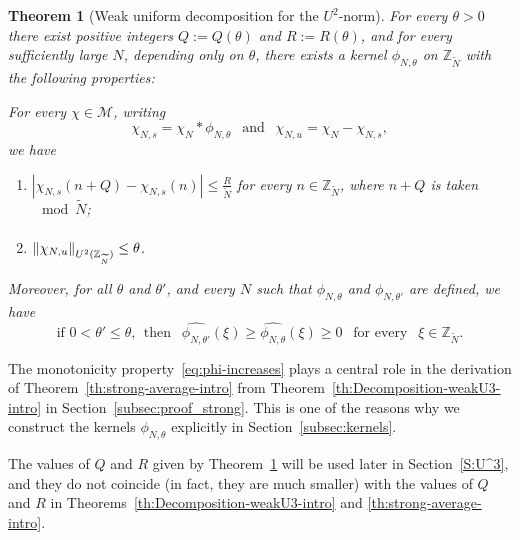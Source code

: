 \documentclass[11pt]{amsart}
\newtheorem{theorem}[lemma]{Theorem}
\theoremstyle{definition}
\begin{document}
\begin{theorem}[Weak uniform decomposition for the $U^2$-norm]
\label{th:Decomposition-weakU2-intro} For every $\theta>0$ there
exist  positive integers $Q:=Q(\theta)$ and  $R:=R(\theta)$, and for
every sufficiently large $N$,  depending only on
 $\theta$,  there exists a kernel $\phi_{N,\theta}$ on ${{{\mathbb Z}}_{\widetilde N}}$
with the following properties:

For   every $\chi\in{{\mathcal M}}$, writing
$$
\chi_{N,s}=\chi_N*\phi_{N,\theta}\ \ \text{ and }\ \
\chi_{N,u}=\chi_N-\chi_{N,s},
$$
we have
\begin{enumerate}
\item
\label{it:decomU22} {\rule{0mm}{5mm}} $\displaystyle
|\chi_{N,s}(n+Q)-\chi_{N,s}(n)|\leq \frac{R}{{\widetilde N}}$ for every $n\in{{{\mathbb Z}}_{\widetilde N}}$,
where  $n+Q$ is taken \!\!\!$\mod{{\widetilde N}}$;
\item
\label{it:decomU23}
 ${\rule{0mm}{5mm}}\displaystyle{\lVert {\chi_{N,u}} \rVert}_{U^2({{{\mathbb Z}}_{\widetilde N}})}\leq\theta$.
\end{enumerate}
Moreover, for all $\theta$ and $\theta'$, and every $N$ such that
$\phi_{N,\theta}$ and $\phi_{N,\theta'}$ are defined, we have
\begin{equation}
\label{eq:phi-increases} \text{if }0<\theta'\leq\theta,\ \ \text{
then }\ \  \widehat{\phi_{N,\theta'}}(\xi)\geq
\widehat{\phi_{N,\theta}}(\xi)\geq  0\  \ \text{ for every }\ \
\xi\in{{{\mathbb Z}}_{\widetilde N}}.
\end{equation}
\end{theorem}
The monotonicity property~\eqref{eq:phi-increases} plays a central
role in the derivation of Theorem~\ref{th:strong-average-intro} from
Theorem~\ref{th:Decomposition-weakU3-intro} in
Section~\ref{subsec:proof_strong}. This  is  one of the reasons why
we construct the kernels $\phi_{N,\theta}$  explicitly in
Section~\ref{subsec:kernels}.

The
 values of  $Q$ and $R$ given by  Theorem~\ref{th:Decomposition-weakU2-intro}
  will be  used later in Section~\ref{S:U^3}, and  they do not coincide
  (in fact, they are much smaller) with the values of $Q$ and $R$ in
   Theorems~\ref{th:Decomposition-weakU3-intro} and  \ref{th:strong-average-intro}.
\end{document}
